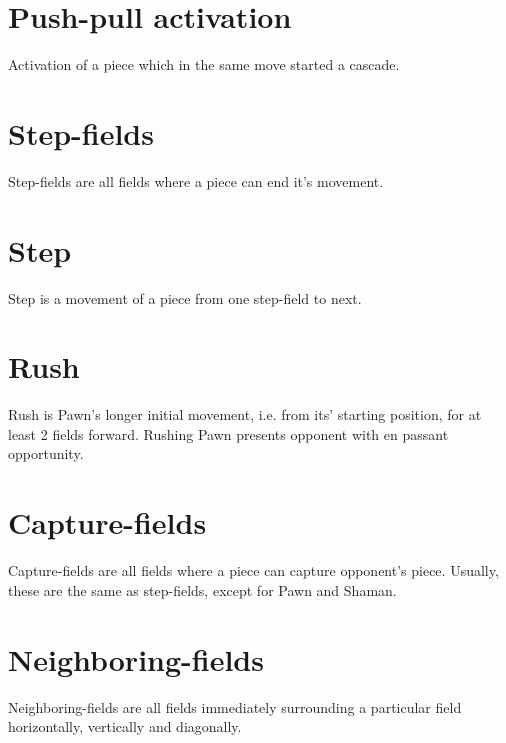 \section*{Push-pull activation}
\label{sec:Terms/Push-pull activation}
Activation of a piece which in the same move started a cascade.

\section*{Step-fields}
\label{sec:Terms/Step-fields}
Step-fields are all fields where a piece can end it's movement.

\section*{Step}
\label{sec:Terms/Step}
Step is a movement of a piece from one step-field to next.

\section*{Rush}
\label{sec:Terms/Rush}
Rush is Pawn's longer initial movement, i.e. from its’ starting position, for at least 2 fields forward.
Rushing Pawn presents opponent with en passant opportunity.

\section*{Capture-fields}
\label{sec:Terms/Capture-fields}
Capture-fields are all fields where a piece can capture opponent's piece.
Usually, these are the same as step-fields, except for Pawn and Shaman.

\section*{Neighboring-fields}
\label{sec:Terms/Neighboring-fields}
Neighboring-fields are all fields immediately surrounding a particular field horizontally,
vertically and diagonally.


